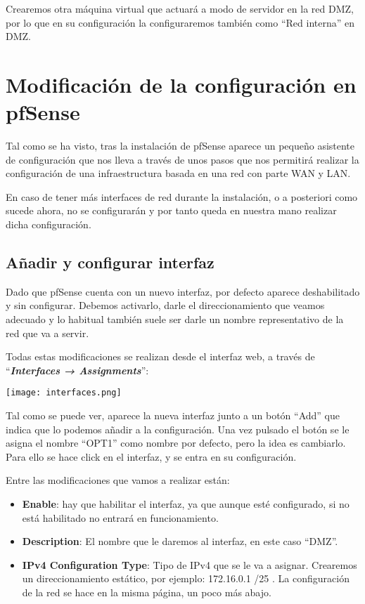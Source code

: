 Crearemos otra máquina virtual que actuará a modo de servidor en la red DMZ, por lo que en su configuración la configuraremos también como “Red interna” en DMZ.


\section{Modificación de la configuración en pfSense}
Tal como se ha visto, tras la instalación de pfSense aparece un pequeño asistente de configuración que nos lleva a través de unos pasos que nos permitirá realizar la configuración de una infraestructura basada en una red con parte WAN y LAN.

En caso de tener más interfaces de red durante la instalación, o a posteriori como sucede ahora, no se configurarán y por tanto queda en nuestra mano realizar dicha configuración.


\subsection{Añadir y configurar interfaz}
Dado que pfSense cuenta con un nuevo interfaz, por defecto aparece deshabilitado y sin configurar. Debemos activarlo, darle el direccionamiento que veamos adecuado y lo habitual también suele ser darle un nombre representativo de la red que va a servir.

Todas estas modificaciones se realizan desde el interfaz web, a través de “\textit{\textbf{Interfaces → Assignments}}”:

\begin{center}
    \vspace{-10pt}
    \texttt{[image: interfaces.png]}
    \vspace{-20pt}
\end{center}

Tal como se puede ver, aparece la nueva interfaz junto a un botón “Add” que indica que lo podemos añadir a la configuración. Una vez pulsado el botón se le asigna el nombre “OPT1” como nombre por defecto, pero la idea es cambiarlo. Para ello se hace click en el interfaz, y se entra en su configuración.

Entre las modificaciones que vamos a realizar están:

\begin{itemize}
    \item \textbf{Enable}: hay que habilitar el interfaz, ya que aunque esté configurado, si no está habilitado no entrará en funcionamiento.
    \item \textbf{Description}: El nombre que le daremos al interfaz, en este caso “DMZ”.
    \item \textbf{IPv4 Configuration Type}: Tipo de IPv4 que se le va a asignar. Crearemos un direccionamiento estático, por ejemplo: 172.16.0.1 /25 . La configuración de la red se hace en la misma página, un poco más abajo.
\end{itemize}

